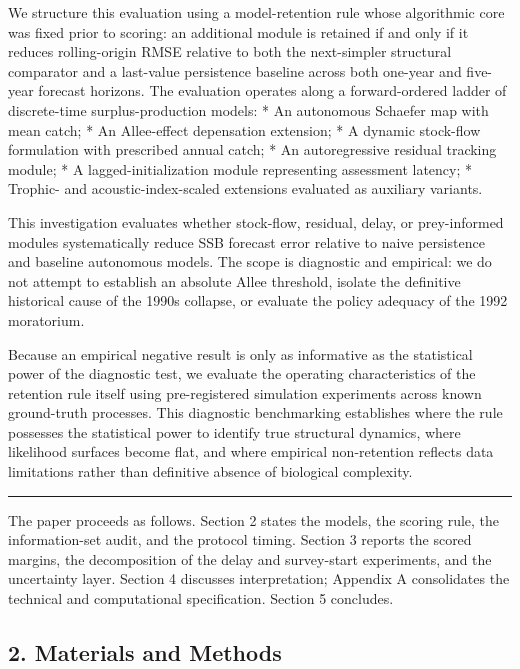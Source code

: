 \documentclass[11pt]{article}
\begin{document}
We structure this evaluation using a model-retention rule whose
algorithmic core was fixed prior to scoring: an additional module is
retained if and only if it reduces rolling-origin RMSE relative to both
the next-simpler structural comparator and a last-value persistence
baseline across both one-year and five-year forecast horizons. The
evaluation operates along a forward-ordered ladder of discrete-time
surplus-production models: * An autonomous Schaefer map with mean catch;
* An Allee-effect depensation extension; * A dynamic stock-flow
formulation with prescribed annual catch; * An autoregressive residual
tracking module; * A lagged-initialization module representing
assessment latency; * Trophic- and acoustic-index-scaled extensions
evaluated as auxiliary variants.

This investigation evaluates whether stock-flow, residual, delay, or
prey-informed modules systematically reduce SSB forecast error relative
to naive persistence and baseline autonomous models. The scope is
diagnostic and empirical: we do not attempt to establish an absolute
Allee threshold, isolate the definitive historical cause of the 1990s
collapse, or evaluate the policy adequacy of the 1992 moratorium.

Because an empirical negative result is only as informative as the
statistical power of the diagnostic test, we evaluate the operating
characteristics of the retention rule itself using pre-registered
simulation experiments across known ground-truth processes. This
diagnostic benchmarking establishes where the rule possesses the
statistical power to identify true structural dynamics, where likelihood
surfaces become flat, and where empirical non-retention reflects data
limitations rather than definitive absence of biological complexity.

\begin{center}\rule{0.5\linewidth}{0.5pt}\end{center}

The paper proceeds as follows. Section 2 states the models, the scoring
rule, the information-set audit, and the protocol timing. Section 3
reports the scored margins, the decomposition of the delay and
survey-start experiments, and the uncertainty layer. Section 4 discusses
interpretation; Appendix A consolidates the technical and computational
specification. Section 5 concludes.

\subsection{2. Materials and Methods}\label{materials-and-methods}
\end{document}
